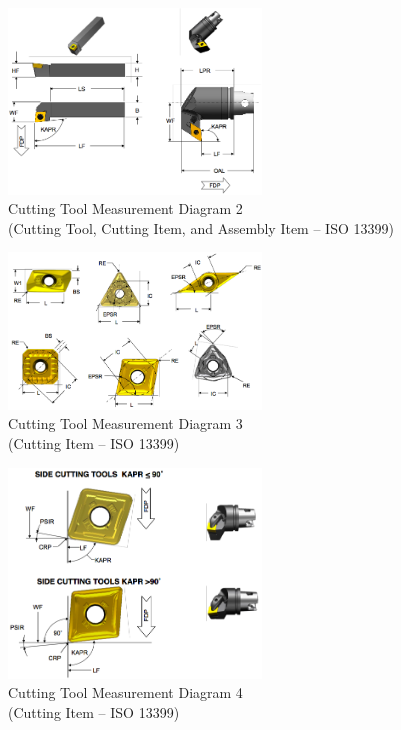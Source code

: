 \begin{figure}[ht]
  \centering
  \includegraphics[width=0.6\textwidth]{figures/a2-cutting-tool-measurement-diagram-4.png}
  \caption{Cutting Tool Measurement Diagram 2
  \\  (Cutting Tool, Cutting Item, and Assembly Item – ISO 13399)}
  \label{fig:a2-cutting-tool-measurement-diagram-4}
\end{figure}
\FloatBarrier


\begin{figure}[ht]
  \centering
  \includegraphics[width=0.6\textwidth]{figures/a3-cutting-item-measurement-diagram-3.png}
  \caption{Cutting Tool Measurement Diagram 3
  \\  (Cutting Item – ISO 13399)}
  \label{fig:a3-cutting-item-measurement-diagram-3}
\end{figure}
\FloatBarrier

\begin{figure}[ht]
  \centering
  \includegraphics[width=0.6\textwidth]{figures/a4-cutting-item-measurement-diagram-4.png}
  \caption{Cutting Tool Measurement Diagram 4
  \\  (Cutting Item – ISO 13399)}
  \label{fig:a4-cutting-item-measurement-diagram-4}
\end{figure}
\FloatBarrier

